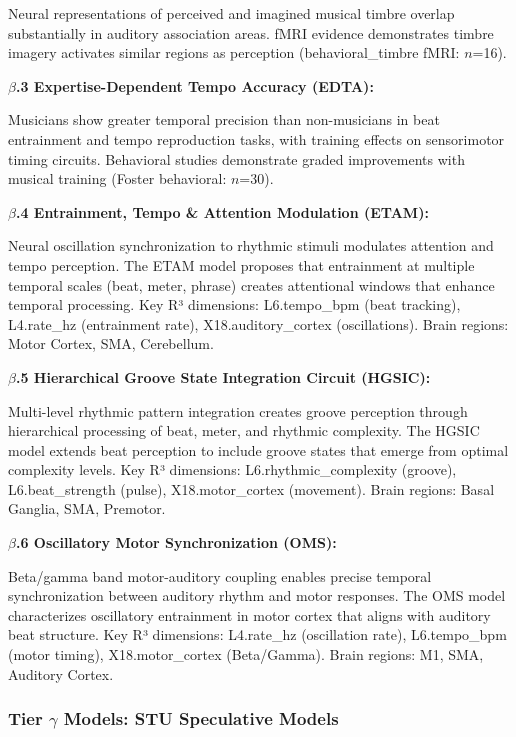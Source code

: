 \documentclass[9pt,onecolumn]{article}
\begin{document}
Neural representations of perceived and imagined musical timbre overlap substantially in auditory association areas. fMRI evidence demonstrates timbre imagery activates similar regions as perception (behavioral\_timbre fMRI: $n$=16).

\textbf{$\beta$.3 Expertise-Dependent Tempo Accuracy (EDTA):}

Musicians show greater temporal precision than non-musicians in beat entrainment and tempo reproduction tasks, with training effects on sensorimotor timing circuits. Behavioral studies demonstrate graded improvements with musical training (Foster behavioral: $n$=30).

\textbf{$\beta$.4 Entrainment, Tempo \& Attention Modulation (ETAM):}

Neural oscillation synchronization to rhythmic stimuli modulates attention and tempo perception. The ETAM model proposes that entrainment at multiple temporal scales (beat, meter, phrase) creates attentional windows that enhance temporal processing. Key R³ dimensions: L6.tempo\_bpm (beat tracking), L4.rate\_hz (entrainment rate), X18.auditory\_cortex (oscillations). Brain regions: Motor Cortex, SMA, Cerebellum.

\textbf{$\beta$.5 Hierarchical Groove State Integration Circuit (HGSIC):}

Multi-level rhythmic pattern integration creates groove perception through hierarchical processing of beat, meter, and rhythmic complexity. The HGSIC model extends beat perception to include groove states that emerge from optimal complexity levels. Key R³ dimensions: L6.rhythmic\_complexity (groove), L6.beat\_strength (pulse), X18.motor\_cortex (movement). Brain regions: Basal Ganglia, SMA, Premotor.

\textbf{$\beta$.6 Oscillatory Motor Synchronization (OMS):}

Beta/gamma band motor-auditory coupling enables precise temporal synchronization between auditory rhythm and motor responses. The OMS model characterizes oscillatory entrainment in motor cortex that aligns with auditory beat structure. Key R³ dimensions: L4.rate\_hz (oscillation rate), L6.tempo\_bpm (motor timing), X18.motor\_cortex (Beta/Gamma). Brain regions: M1, SMA, Auditory Cortex.

\subsubsection{Tier $\gamma$ Models: STU Speculative Models}
\end{document}
